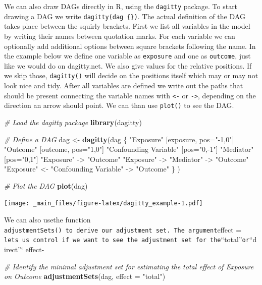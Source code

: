 \documentclass[
]{book}
\newenvironment{Shaded}{\begin{snugshade}}{\end{snugshade}}
\newcommand{\AttributeTok}[1]{\textcolor[rgb]{0.13,0.29,0.53}{#1}}
\newcommand{\CommentTok}[1]{\textcolor[rgb]{0.56,0.35,0.01}{\textit{#1}}}
\newcommand{\FunctionTok}[1]{\textcolor[rgb]{0.13,0.29,0.53}{\textbf{#1}}}
\newcommand{\NormalTok}[1]{#1}
\newcommand{\OtherTok}[1]{\textcolor[rgb]{0.56,0.35,0.01}{#1}}
\newcommand{\StringTok}[1]{\textcolor[rgb]{0.31,0.60,0.02}{#1}}
\begin{document}
We can also draw DAGs directly in R, using the \texttt{dagitty} package.
To start drawing a DAG we write \texttt{dagitty(\textquotesingle{}dag\ \{\})}.
The actual definition of the DAG takes place between the squirly brackets.
First we list all variables in the model by writing their names between
quotation marks. For each variable we can optionally add additional options between square
brackets following the name. In the example below we define one variable as \texttt{exposure}
and one as \texttt{outcome}, just like we would do on dagitty.net. We also give values
for the relative positions. If we skip those, \texttt{dagitty()} will decide on the positions
itself which may or may not look nice and tidy. After all variables are defined
we write out the paths that should be present connecting the variable names with
\texttt{\textless{}-} or \texttt{-\textgreater{}}, depending on the direction an arrow should point. We can than use \texttt{plot()}
to see the DAG.

\begin{Shaded}
\begin{Highlighting}[]
\CommentTok{\# Load the dagitty package}
\FunctionTok{library}\NormalTok{(dagitty)}

\CommentTok{\# Define a DAG}
\NormalTok{dag }\OtherTok{\textless{}{-}} \FunctionTok{dagitty}\NormalTok{(}\StringTok{\textquotesingle{}dag \{}
\StringTok{  "Exposure" [exposure, pos="{-}1,0"]}
\StringTok{  "Outcome" [outcome, pos="1,0"]}
\StringTok{  "Confounding Variable" [pos="0,{-}1"] }
\StringTok{  "Mediator" [pos="0,1"]}
\StringTok{  "Exposure" {-}\textgreater{} "Outcome"}
\StringTok{  "Exposure" {-}\textgreater{} "Mediator" {-}\textgreater{} "Outcome"}
\StringTok{  "Exposure" \textless{}{-} "Confounding Variable" {-}\textgreater{} "Outcome"}
\StringTok{\}\textquotesingle{}}\NormalTok{ )}

\CommentTok{\# Plot the DAG}
\FunctionTok{plot}\NormalTok{(dag)}
\end{Highlighting}
\end{Shaded}

\texttt{[image: \_main\_files/figure-latex/dagitty\_example-1.pdf]}

We can also usethe function \texttt{adjustmentSets()\ to\ derive\ our\ adjustment\ set.\ The\ argument}effect = \texttt{lets\ us\ control\ if\ we\ want\ to\ see\ the\ adjustment\ set\ for\ the}``total''\texttt{or}``direct''` effect-

\begin{Shaded}
\begin{Highlighting}[]
\CommentTok{\# Identify the minimal adjustment set for estimating the total effect of Exposure on Outcome}
\FunctionTok{adjustmentSets}\NormalTok{(dag, }\AttributeTok{effect =} \StringTok{"total"}\NormalTok{)}
\end{Highlighting}
\end{Shaded}
\end{document}
